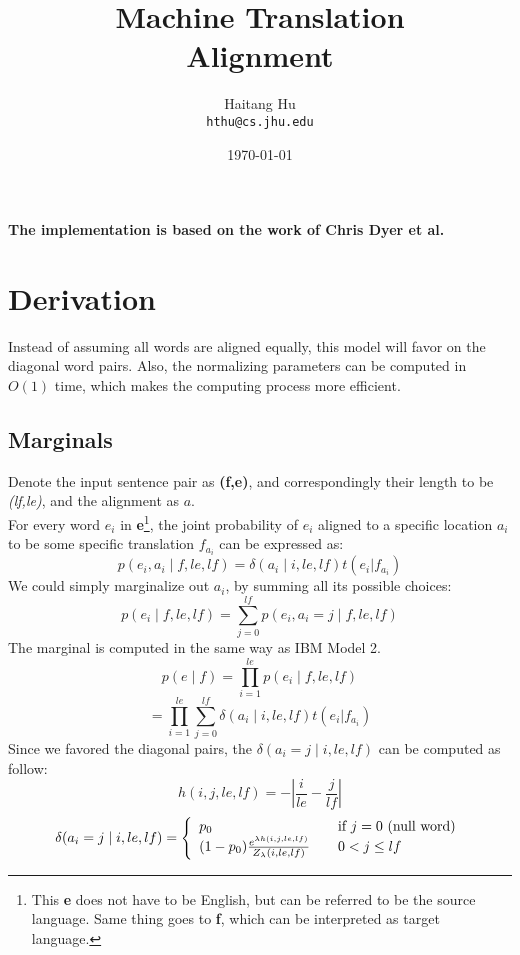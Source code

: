 \documentclass[11pt]{article}
\title{Machine Translation\\Alignment}
\author{Haitang Hu \\
  {\tt hthu@cs.jhu.edu}}
\date{\today}
\begin{document}
\large
\maketitle
\thispagestyle{headings}
\noindent
\textbf{The implementation is based on the work of Chris Dyer et al.\cite{fast}\\
\url{}}

\section{Derivation} %
\label{sec:derivation}
Instead of assuming all words are aligned equally, this model will favor on the diagonal word pairs. Also, the normalizing parameters can be computed in $O(1)$ time, which makes the computing process more efficient.

\subsection{Marginals} %
\label{sub:marginals}
Denote the input sentence pair as \textbf{(f,e)}, and correspondingly their length to be \textit{(lf,le)}, and the alignment as $a$.\\
For every word $e_i$ in \textbf{e}\footnote{This \textbf{e} does not have to be English, but can be referred to be the source language. Same thing goes to \textbf{f}, which can be interpreted as target language.}, the joint probability of $e_i$ aligned to a specific location $a_i$ to be some specific translation $f_{a_i}$ can be expressed as:
$$ p(e_i, a_i \mid f, le, lf) = \delta(a_i \mid i, le, lf) t(e_i| f_{a_i})$$
We could simply marginalize out $a_i$, by summing all its possible choices:
$$ p(e_i \mid f, le, lf) = \sum_{j=0}^{lf} p(e_i, a_i =j \mid f, le, lf)$$
The marginal is computed in the same way as IBM Model 2.\\
$$ p(e \mid f) = \prod_{i=1}^{le}p(e_i \mid f, le, lf) $$
$$ = \prod_{i=1}^{le} \sum_{j=0}^{lf} \delta(a_i \mid i, le, lf) t(e_i| f_{a_i})$$
Since we favored the diagonal pairs, the $\delta(a_i = j \mid i, le, lf)$ can be computed as follow:
$$ h(i,j,le,lf) = - |\frac{i}{le} - \frac{j}{lf}|$$
\[ \delta(a_i = j \mid i, le, lf) = \left\{
  \begin{array}{l l}
    p_0 & \quad \text{if $j = 0$ (null word)}\\
    (1-p_0) \frac{e^{\lambda h(i,j, le, lf)}}{Z_{\lambda}(i, le, lf)} & \quad 0 < j \leq lf
  \end{array} \right.\]
\end{document}
